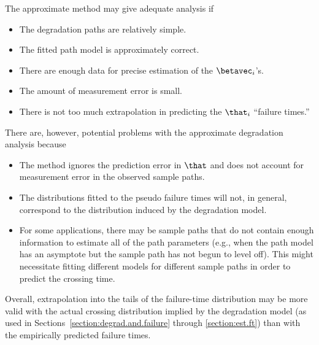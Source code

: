The approximate method  may give  adequate analysis if
\begin{itemize}
\item
The degradation paths are relatively simple.
\item
The fitted path model is approximately correct.
\item
There are enough  data for precise estimation
of the $\betavec_{i}$'s.
\item
The amount of measurement error is small.
\item
There is not too much extrapolation in predicting
the $\that_{i}$ ``failure times.''
\end{itemize} 
There are, however, 
potential problems with the  approximate degradation analysis
because
\begin{itemize}
\item
The method ignores the prediction error in $\that$ and does not
account for measurement error in the observed sample paths.
\item
The distributions fitted to the pseudo failure times will not, in general,
correspond to the distribution induced by the degradation model.
\item
For some applications, there may be sample paths that do not contain
enough information to estimate all of the path parameters (e.g.,
when the path model has an asymptote but the sample path has not
begun to level off). This might necessitate fitting different models
for different sample paths in order to predict the crossing time.
\end{itemize}
Overall, extrapolation into the tails of
the failure-time distribution may be more valid
with the actual crossing distribution implied by the degradation
model (as used in
Sections~\ref{section:degrad.and.failure} through
\ref{section:est.ft}) than with the empirically 
predicted failure times.

